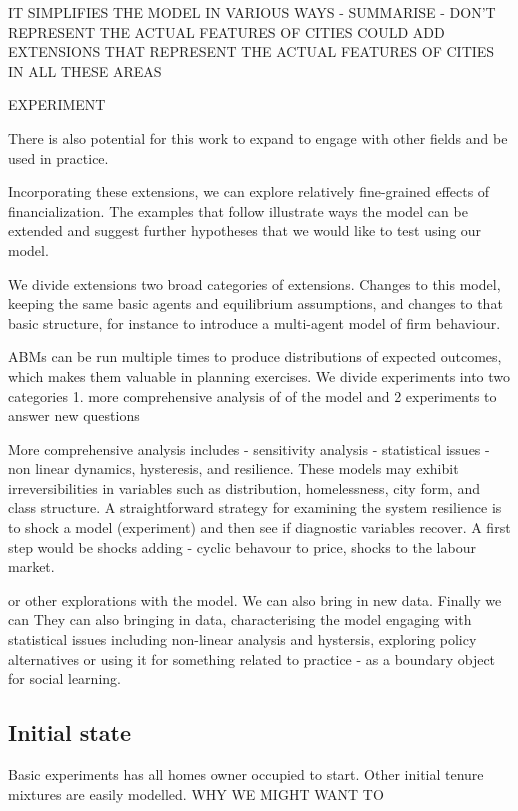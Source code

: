 IT SIMPLIFIES THE MODEL IN VARIOUS WAYS - SUMMARISE - DON'T REPRESENT THE ACTUAL FEATURES OF CITIES COULD ADD EXTENSIONS THAT REPRESENT THE ACTUAL FEATURES OF CITIES IN ALL THESE AREAS



EXPERIMENT

There is also potential for this work to expand to engage with other fields and be used in practice.



Incorporating these extensions, we can explore relatively fine-grained effects of financialization. The examples that follow  illustrate   ways the model can be extended and suggest further hypotheses that we  would like to test using our model.

We divide extensions two broad categories of extensions. Changes to this model, keeping the same basic agents and equilibrium assumptions, and changes to that basic structure, for instance to introduce a multi-agent model of firm behaviour.

ABMs can be run multiple times to produce distributions of expected outcomes, which makes them valuable in planning exercises.
We divide experiments into two categories 1. more comprehensive analysis of of the model and 2 experiments to answer new questions

More comprehensive analysis includes
- sensitivity analysis
- statistical issues
- non linear dynamics, hysteresis, and resilience. %
These models may exhibit irreversibilities in variables such as distribution, homelessness, city form, and class structure. 
A straightforward strategy for examining the system resilience is to shock a model (experiment) and then see if diagnostic variables recover. %
A first step would be shocks adding - cyclic behavour to price, shocks  to the labour market.

 or other explorations with the model. We can also bring in new data. Finally we can
They can also bringing in data, characterising the model engaging with statistical issues including non-linear analysis and hystersis, exploring policy alternatives or using it for something related to practice - as a boundary object for social learning.


\subsection{Initial state}
Basic experiments has all homes owner occupied to start. Other initial tenure mixtures are easily modelled. WHY WE MIGHT WANT TO

